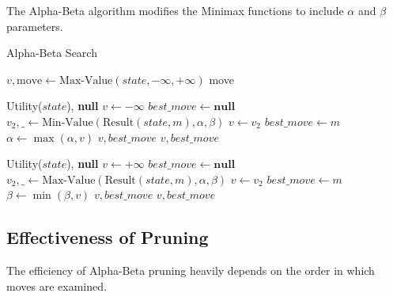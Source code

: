 \documentclass[11pt]{article}
\begin{document}
The Alpha-Beta algorithm modifies the Minimax functions to include $\alpha$ and $\beta$ parameters.

\begin{algorithm}
\caption{Alpha-Beta Search}
\label{alg:alphabeta}
\begin{algorithmic}[1]
    \State $v, \text{move} \gets \text{Max-Value}(state, -\infty, +\infty)$
    \State \Return move 
\EndFunction

     \Return Utility($state$), \textbf{null} \EndIf
    \State $v \gets -\infty$
    \State $best\_move \gets \textbf{null}$
        \State $v_2, \_ \gets \text{Min-Value}(\text{Result}(state, m), \alpha, \beta)$ 
            \State $v \gets v_2$
            \State $best\_move \gets m$
            \State $\alpha \gets \max(\alpha, v)$
        \EndIf
         
            \State \Return $v, best\_move$
        \EndIf
    \EndFor
    \State \Return $v, best\_move$
\EndFunction

     \Return Utility($state$), \textbf{null} \EndIf
    \State $v \gets +\infty$
    \State $best\_move \gets \textbf{null}$
        \State $v_2, \_ \gets \text{Max-Value}(\text{Result}(state, m), \alpha, \beta)$ 
            \State $v \gets v_2$
            \State $best\_move \gets m$
            \State $\beta \gets \min(\beta, v)$
        \EndIf
         
            \State \Return $v, best\_move$
        \EndIf
    \EndFor
    \State \Return $v, best\_move$
\EndFunction
\end{algorithmic}
\end{algorithm}

\subsection{Effectiveness of Pruning}

The efficiency of Alpha-Beta pruning heavily depends on the order in which moves are examined.
\end{document}

